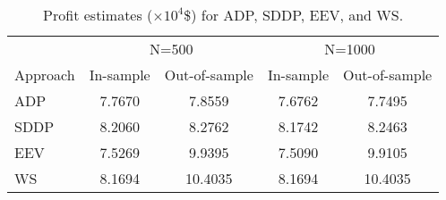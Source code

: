 \begin{table}[t]
\centering
\caption{Profit estimates (\(\times 10^{4}\)\$) for ADP, SDDP, EEV, and WS.}
\label{tab:profit_estimates}
\begin{tabular}{lcccc}
\toprule
& \multicolumn{2}{c}{N=500} & \multicolumn{2}{c}{N=1000} \\
\cmidrule(lr){2-3}\cmidrule(lr){4-5}
Approach & In-sample & Out-of-sample & In-sample & Out-of-sample \\
\midrule
ADP & 7.7670 & 7.8559 & 7.6762 & 7.7495 \\
SDDP & 8.2060 & 8.2762 & 8.1742 & 8.2463 \\
EEV & 7.5269 & 9.9395 & 7.5090 & 9.9105 \\
WS & 8.1694 & 10.4035 & 8.1694 & 10.4035 \\
\bottomrule
\end{tabular}
\end{table}